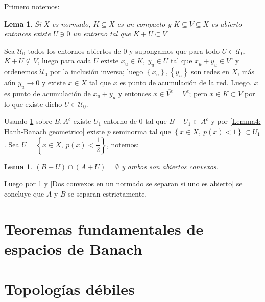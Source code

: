 \documentclass[11pt]{article}
\newcommand{\sett}[1]{\left\lbrace#1\right\rbrace}
\numberwithin{theorem}{subsection}
\newtheorem{lemma}[theorem]{Lema}
\newenvironment{proof}[1][Demostraci\'on]{\begin{trivlist}
		\item[\hskip \labelsep {\bfseries #1}]}{\end{trivlist}}
\newcommand{\qed}{\nobreak \ifvmode \relax \else
	\ifdim\lastskip<1.5em \hskip-\lastskip
	\hskip1.5em plus0em minus0.5em \fi \nobreak
	\vrule height0.75em width0.5em depth0.25em\fi}
\begin{document}
\begin{proof}
	Primero notemos:

\begin{lemma}
	\label{Lemma1: Un cerrado se separa de un compacto}
	Si $X$ es normado, $K \subseteq X$ es un compacto y $K \subseteq V \subseteq X$ es abierto entonces existe $U \ni 0$ un entorno tal que $K + U \subset V$
\end{lemma}

\begin{proof}[Demostraci\'on del lema]
	Sea $\mathcal{U}_0$ todos los entornos abiertos de $0$ y supongamos que para todo $U \in \mathcal{U}_0$, $K+U \not \subseteq V$, luego para cada $U$ existe $x_u \in K, \ y_u \in U$ tal que $x_u+y_u \in V^{c}$ y ordenemos $\mathcal{U}_0$ por la inclusi\'on inversa; luego $\sett{x_u},\sett{y_u}$ son redes en $X$, m\'as a\'un $y_u \rightarrow 0$ y existe $x \in X$ tal que $x$ es punto de acumulaci\'on de la red. Luego, $x$ es punto de acumulaci\'on de $x_u+y_u$ y entonces $x \in \overline{V^{c}} = V^{c}$; pero $x \in K \subset V$ por lo que existe dicho $U \in \mathcal{U}_0$. \qed
\end{proof}

Usando \ref{Lemma1: Un cerrado se separa de un compacto} sobre $B, A^{c}$ existe $U_1$ entorno de $0$ tal que $B+U_1 \subset A^c$ y por \ref{Lemma4: Hanh-Banach geometrico} existe $p$ seminorma tal que $\sett{x \in X, \ p(x) < 1} \subset U_1$. Sea $U = \sett{x \in X, \ p(x) < \dfrac{1}{2}}$, notemos:

\begin{lemma}
	\label{Lemma2: Un cerrado se separa de un compacto}
	 $\left(B+U\right)\cap \left(A + U\right) = \emptyset$ y ambos son abiertos convexos.
\end{lemma}

Luego por \ref{Lemma2: Un cerrado se separa de un compacto} y \ref{Dos convexos en un normado se separan si uno es abierto} se concluye que $A$ y $B$ se separan estrictamente.

\end{proof}


\section{Teoremas fundamentales de espacios de Banach}

\section{Topolog\'ias d\'ebiles}
\end{document}
